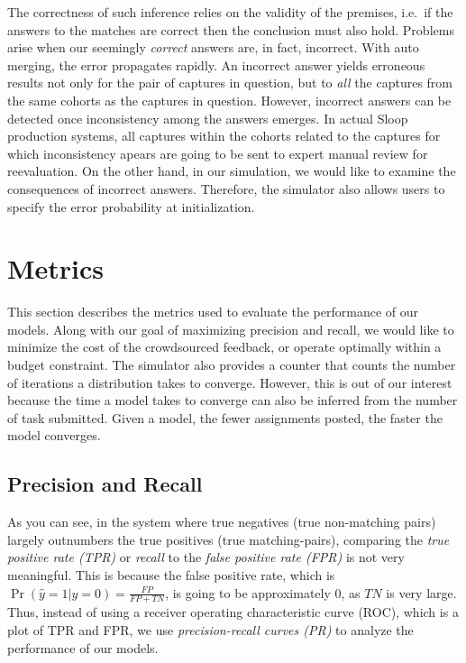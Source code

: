 The correctness of such inference relies on the validity of the premises, i.e.\
if the answers to the matches are correct then the conclusion must also hold.
Problems arise when our seemingly \emph{correct} answers are, in fact,
incorrect. With auto merging, the error propagates rapidly. An incorrect answer
yields erroneous results not only for the pair of captures in question, but to
\emph{all} the captures from the same cohorts as the captures in question.
However, incorrect answers can be detected once inconsistency among the answers
emerges. In actual Sloop production systems, all captures within the cohorts
related to the captures for which inconsistency apears are going to be sent to
expert manual review for reevaluation. On the other hand, in our simulation, we
would like to examine the consequences of incorrect answers.  Therefore, the
simulator also allows users to specify the error probability at initialization.

\section{Metrics} %
\label{sec:metrices}

This section describes the metrics used to evaluate the performance of our
models.  Along with our goal of maximizing precision and recall, we would like
to minimize the cost of the crowdsourced feedback, or operate optimally within a
budget constraint. The simulator also provides a counter that counts the number
of iterations a distribution takes to converge. However, this is out of our
interest because the time a model takes to converge can also be inferred from
the number of task submitted. Given a model, the fewer assignments posted, the
faster the model converges.

\subsection{Precision and Recall} %
\label{sub:precision_and_recall}

As you can see, in the system where true negatives (true non-matching pairs)
largely outnumbers the true positives (true matching-pairs), comparing the
\emph{true positive rate (TPR)} or \emph{recall} to the \emph{false positive
rate (FPR)} is not very meaningful. This is because the false positive rate,
which is $\Pr{(\hat{y}=1|y=0)} = \frac{FP}{FP+TN}$, is going to be approximately
0, as $TN$ is very large. Thus, instead of using a receiver operating
characteristic curve (ROC), which is a plot of TPR and FPR, we use \emph
{precision-recall curves (PR)} to analyze the performance of our models.

